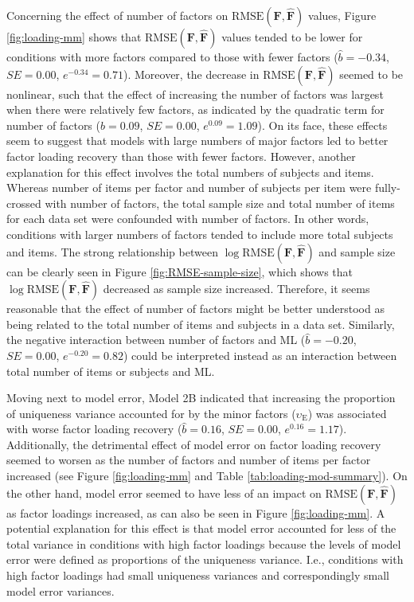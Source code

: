 \documentclass[
  english,
  man]{apa6}
\begin{document}
Concerning the effect of number of factors on \(\textrm{RMSE}(\mathbf{F}, \hat{\mathbf{F}})\) values, Figure \ref{fig:loading-mm} shows that \(\textrm{RMSE}(\mathbf{F}, \hat{\mathbf{F}})\) values tended to be lower for conditions with more factors compared to those with fewer factors (\(\hat{b} = -0.34\), \(SE = 0.00\), \(e^{-0.34} = 0.71\)). Moreover, the decrease in \(\textrm{RMSE}(\mathbf{F}, \hat{\mathbf{F}})\) seemed to be nonlinear, such that the effect of increasing the number of factors was largest when there were relatively few factors, as indicated by the quadratic term for number of factors (\(\hat{b} = 0.09\), \(SE = 0.00\), \(e^{0.09} = 1.09\)). On its face, these effects seem to suggest that models with large numbers of major factors led to better factor loading recovery than those with fewer factors. However, another explanation for this effect involves the total numbers of subjects and items. Whereas number of items per factor and number of subjects per item were fully-crossed with number of factors, the total sample size and total number of items for each data set were confounded with number of factors. In other words, conditions with larger numbers of factors tended to include more total subjects and items. The strong relationship between \(\log \textrm{RMSE}(\mathbf{F}, \hat{\mathbf{F}})\) and sample size can be clearly seen in Figure \ref{fig:RMSE-sample-size}, which shows that \(\log \textrm{RMSE}(\mathbf{F}, \hat{\mathbf{F}})\) decreased as sample size increased. Therefore, it seems reasonable that the effect of number of factors might be better understood as being related to the total number of items and subjects in a data set. Similarly, the negative interaction between number of factors and ML (\(\hat{b} = -0.20\), \(SE = 0.00\), \(e^{-0.20} = 0.82\)) could be interpreted instead as an interaction between total number of items or subjects and ML.

Moving next to model error, Model 2B indicated that increasing the proportion of uniqueness variance accounted for by the minor factors (\(\upsilon_\textrm{E}\)) was associated with worse factor loading recovery (\(\hat{b} = 0.16\), \(SE = 0.00\), \(e^{0.16} = 1.17\)). Additionally, the detrimental effect of model error on factor loading recovery seemed to worsen as the number of factors and number of items per factor increased (see Figure \ref{fig:loading-mm} and Table \ref{tab:loading-mod-summary}). On the other hand, model error seemed to have less of an impact on \(\textrm{RMSE}(\mathbf{F}, \hat{\mathbf{F}})\) as factor loadings increased, as can also be seen in Figure \ref{fig:loading-mm}. A potential explanation for this effect is that model error accounted for less of the total variance in conditions with high factor loadings because the levels of model error were defined as proportions of the uniqueness variance. I.e., conditions with high factor loadings had small uniqueness variances and correspondingly small model error variances.
\end{document}
